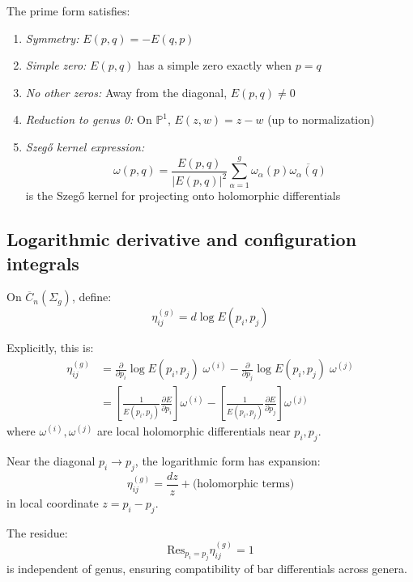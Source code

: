 \begin{theorem}
\label{thm:prime-form-properties}
The prime form satisfies:
\begin{enumerate}
\item \emph{Symmetry:} $E(p, q) = -E(q, p)$
\item \emph{Simple zero:} $E(p, q)$ has a simple zero exactly when $p = q$
\item \emph{No other zeros:} Away from the diagonal, $E(p, q) \neq 0$
\item \emph{Reduction to genus 0:} On $\mathbb{P}^1$, $E(z, w) = z - w$ (up to normalization)
\item \emph{Szegő kernel expression:}
\begin{equation}
\omega(p, q) = \frac{E(p, q)}{|E(p, q)|^2} \sum_{\alpha=1}^g \omega_\alpha(p) \overline{\omega_\alpha(q)}
\end{equation}
is the Szegő kernel for projecting onto holomorphic differentials
\end{enumerate}
\end{theorem}

\subsection{Logarithmic derivative and configuration integrals}

\begin{definition}
\label{def:log-forms-genus-g-complete}
On $\overline{C}_n(\Sigma_g)$, define:
\begin{equation}
\eta_{ij}^{(g)} = d \log E(p_i, p_j)
\end{equation}

Explicitly, this is:
\begin{align}
\eta_{ij}^{(g)} &= \frac{\partial}{\partial p_i} \log E(p_i, p_j) \; \omega^{(i)} - \frac{\partial}{\partial p_j} \log E(p_i, p_j) \; \omega^{(j)}\\
&= \left[\frac{1}{E(p_i, p_j)} \frac{\partial E}{\partial p_i}\right] \omega^{(i)} - \left[\frac{1}{E(p_i, p_j)} \frac{\partial E}{\partial p_j}\right] \omega^{(j)}
\end{align}
where $\omega^{(i)}, \omega^{(j)}$ are local holomorphic differentials near $p_i, p_j$.
\end{definition}

\begin{theorem}
\label{thm:residue-prime-form}
Near the diagonal $p_i \to p_j$, the logarithmic form has expansion:
\begin{equation}
\eta_{ij}^{(g)} = \frac{dz}{z} + \text{(holomorphic terms)}
\end{equation}
in local coordinate $z = p_i - p_j$.

The residue:
\begin{equation}
\text{Res}_{p_i = p_j} \eta_{ij}^{(g)} = 1
\end{equation}
is independent of genus, ensuring compatibility of bar differentials across genera.
\end{theorem}


